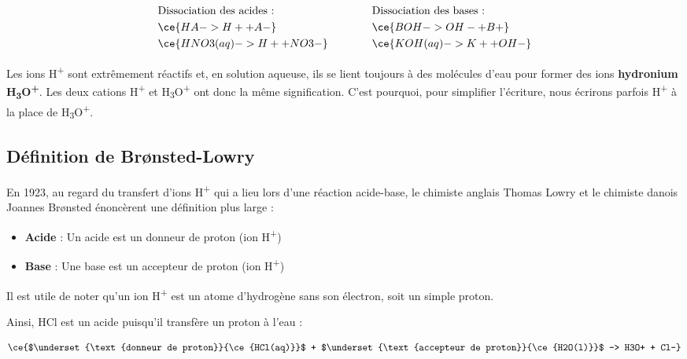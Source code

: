 \documentclass[
  11pt,
  french,
  a4paper,
  openany]{book}
\providecommand{\tightlist}{%
  \setlength{\itemsep}{0pt}\setlength{\parskip}{0pt}}
\begin{document}
\[
\begin{split}
& \text{Dissociation des acides :} \\
& \ce{HA -> H+ + A-} \\
& \ce{HNO3(aq) -> H+ + NO3-}
\end{split}
\qquad\qquad
\begin{split}
& \text{Dissociation des bases :} \\
& \ce{BOH -> OH- + B+} \\
& \ce{KOH(aq) -> K+ + OH-}
\end{split}
\]

Les ions H\textsuperscript{+} sont extrêmement réactifs et, en solution aqueuse, ils se lient toujours à des molécules d'eau pour former des ions \textbf{hydronium H\textsubscript{3}O\textsuperscript{+}}. Les deux cations H\textsuperscript{+} et H\textsubscript{3}O\textsuperscript{+} ont donc la même signification. C'est pourquoi, pour simplifier l'écriture, nous écrirons parfois H\textsuperscript{+} à la place de H\textsubscript{3}O\textsuperscript{+}.

\clearpage

\hypertarget{duxe9finition-de-bruxf8nsted-lowry}{%
\subsection{Définition de Brønsted-Lowry}\label{duxe9finition-de-bruxf8nsted-lowry}}

En 1923, au regard du transfert d'ions H\textsuperscript{+} qui a lieu lors d'une réaction acide-base, le chimiste anglais Thomas Lowry et le chimiste danois Joannes Brønsted énoncèrent une définition plus large :

\begin{itemize}
\tightlist
\item
  \textbf{Acide} : Un acide est un donneur de proton (ion H\textsuperscript{+})
\item
  \textbf{Base} : Une base est un accepteur de proton (ion H\textsuperscript{+})
\end{itemize}

Il est utile de noter qu'un ion H\textsuperscript{+} est un atome d'hydrogène sans son électron, soit un simple proton.

Ainsi, HCl est un acide puisqu'il transfère un proton à l'eau :

\[
\ce{$\underset{\text{donneur de proton}}{\ce{HCl(aq)}}$ + $\underset{\text{accepteur de proton}}{\ce{H2O(l)}}$ -> H3O+ + Cl-}
\]
\end{document}
